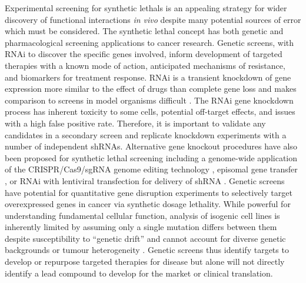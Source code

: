 Experimental screening for \glspl{synthetic lethal} is an appealing strategy for wider discovery of functional interactions \textit{in vivo} despite many potential sources of error which must be considered. The \gls{synthetic lethal} concept has both genetic and pharmacological screening applications to cancer research. Genetic screens, with \gls{RNAi} to discover the specific genes involved, inform development of targeted therapies with a known mode of action, anticipated mechanisms of resistance, and biomarkers for treatment response. \gls{RNAi} is a transient knockdown of gene expression more similar to the effect of drugs than complete gene loss and makes comparison to screens in model organisms difficult \citep{Bussey2006}. The \gls{RNAi} gene knockdown process has inherent toxicity to some cells, potential off-target effects, and issues with a high false positive rate. Therefore, it is important to validate any candidates in a secondary screen and replicate knockdown experiments with a number of independent shRNAs. Alternative gene knockout procedures have also been proposed for \gls{synthetic lethal} screening including a genome-wide application of the CRISPR/Cas9/sgRNA genome editing technology \citep{Sander2014}, episomal gene transfer \citep{Vargas2004}, or \gls{RNAi} with lentiviral transfection for delivery of shRNA \citep{Telford2015}. Genetic screens have potential for quantitative gene disruption experiments to selectively target overexpressed genes in cancer via synthetic dosage lethality. While powerful for understanding fundamental cellular function, analysis of isogenic cell lines is inherently limited by assuming only a single mutation differs between them despite susceptibility to ``genetic drift'' and cannot account for diverse genetic backgrounds or tumour heterogeneity \citep{Fece2015}. Genetic screens thus identify targets to develop or repurpose targeted therapies for disease but alone will not directly identify a lead compound to develop for the market or clinical translation.  

